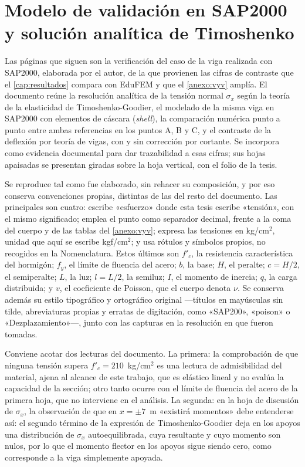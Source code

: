 \chapter{Modelo de validación en SAP2000 y solución analítica de Timoshenko}
\label{anexo:sap2000}

Las páginas que siguen son la verificación del caso de la viga realizada con SAP2000, elaborada por el autor, de la que provienen las cifras de contraste que el \autoref{cap:resultados} compara con EduFEM y que el \autoref{anexo:vyv} amplía. El documento reúne la resolución analítica de la tensión normal $\sigma_x$ según la teoría de la elasticidad de Timoshenko-Goodier, el modelado de la misma viga en SAP2000 con elementos de cáscara (\emph{shell}), la comparación numérica punto a punto entre ambas referencias en los puntos A, B y C, y el contraste de la deflexión por teoría de vigas, con y sin corrección por cortante. Se incorpora como evidencia documental para dar trazabilidad a esas cifras; sus hojas apaisadas se presentan giradas sobre la hoja vertical, con el folio de la tesis.

Se reproduce tal como fue elaborado, sin rehacer su composición, y por eso conserva convenciones propias, distintas de las del resto del documento. Las principales son cuatro: escribe «esfuerzo» donde esta tesis escribe «tensión», con el mismo significado; emplea el punto como separador decimal, frente a la coma del cuerpo y de las tablas del \autoref{anexo:vyv}; expresa las tensiones en kg/cm$^2$, unidad que aquí se escribe kgf/cm$^2$; y usa rótulos y símbolos propios, no recogidos en la Nomenclatura. Estos últimos son $f'_c$, la resistencia característica del hormigón; $f_y$, el límite de fluencia del acero; $b$, la base; $H$, el peralte; $c = H/2$, el semiperalte; $L$, la luz; $l = L/2$, la semiluz; $I$, el momento de inercia; $q$, la carga distribuida; y $v$, el coeficiente de Poisson, que el cuerpo denota $\nu$. Se conserva además su estilo tipográfico y ortográfico original —títulos en mayúsculas sin tilde, abreviaturas propias y erratas de digitación, como «SAP200», «poison» o «Dezplazamiento»—, junto con las capturas en la resolución en que fueron tomadas.

Conviene acotar dos lecturas del documento. La primera: la comprobación de que ninguna tensión supera $f'_c = 210$~kg/cm$^2$ es una lectura de admisibilidad del material, ajena al alcance de este trabajo, que es elástico lineal y no evalúa la capacidad de la sección; otro tanto ocurre con el límite de fluencia del acero de la primera hoja, que no interviene en el análisis. La segunda: en la hoja de discusión de $\sigma_x$, la observación de que en $x = \pm 7$~m «existirá momentos» debe entenderse así: el segundo término de la expresión de Timoshenko-Goodier deja en los apoyos una distribución de $\sigma_x$ autoequilibrada, cuya resultante y cuyo momento son nulos, por lo que el momento flector en los apoyos sigue siendo cero, como corresponde a la viga simplemente apoyada.

